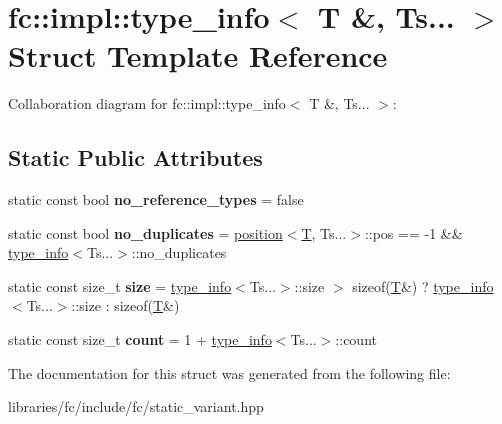 \hypertarget{structfc_1_1impl_1_1type__info_3_01_t_01_6_00_01_ts_8_8_8_01_4}{}\section{fc\+:\+:impl\+:\+:type\+\_\+info$<$ T \&, Ts... $>$ Struct Template Reference}
\label{structfc_1_1impl_1_1type__info_3_01_t_01_6_00_01_ts_8_8_8_01_4}


Collaboration diagram for fc\+:\+:impl\+:\+:type\+\_\+info$<$ T \&, Ts... $>$\+:
\subsection*{Static Public Attributes}
\begin{DoxyCompactItemize}
\item 
\mbox{\label{structfc_1_1impl_1_1type__info_3_01_t_01_6_00_01_ts_8_8_8_01_4_ae776caa111c655ce83aabd9391f5ff3c}} 
static const bool {\bfseries no\+\_\+reference\+\_\+types} = false
\item 
\mbox{\label{structfc_1_1impl_1_1type__info_3_01_t_01_6_00_01_ts_8_8_8_01_4_a5da49e2ad5affa93c3b2100e7ec8195d}} 
static const bool {\bfseries no\+\_\+duplicates} = \mbox{\hyperlink{structfc_1_1impl_1_1position}{position}}$<$\mbox{\hyperlink{struct_t}{T}}, Ts...$>$\+::pos == -\/1 \&\& \mbox{\hyperlink{structfc_1_1impl_1_1type__info}{type\+\_\+info}}$<$Ts...$>$\+::no\+\_\+duplicates
\item 
\mbox{\label{structfc_1_1impl_1_1type__info_3_01_t_01_6_00_01_ts_8_8_8_01_4_a1a9ec17eb3d61670f904e984fb8ce50e}} 
static const size\+\_\+t {\bfseries size} = \mbox{\hyperlink{structfc_1_1impl_1_1type__info}{type\+\_\+info}}$<$Ts...$>$\+::size $>$ sizeof(\mbox{\hyperlink{struct_t}{T}}\&) ? \mbox{\hyperlink{structfc_1_1impl_1_1type__info}{type\+\_\+info}}$<$Ts...$>$\+::size \+: sizeof(\mbox{\hyperlink{struct_t}{T}}\&)
\item 
\mbox{\label{structfc_1_1impl_1_1type__info_3_01_t_01_6_00_01_ts_8_8_8_01_4_a7f92e90cb13ec912c8380e73d3bc7a84}} 
static const size\+\_\+t {\bfseries count} = 1 + \mbox{\hyperlink{structfc_1_1impl_1_1type__info}{type\+\_\+info}}$<$Ts...$>$\+::count
\end{DoxyCompactItemize}


The documentation for this struct was generated from the following file\+:\begin{DoxyCompactItemize}
\item 
libraries/fc/include/fc/static\+\_\+variant.\+hpp\end{DoxyCompactItemize}
